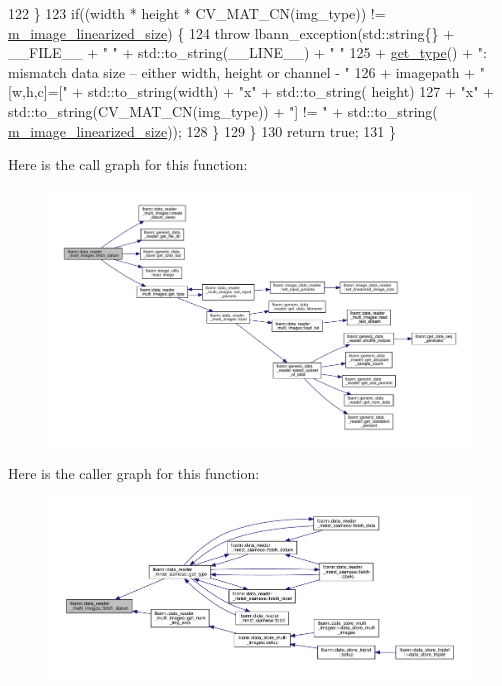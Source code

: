 \begin{DoxyCode}
122     \}
123     \textcolor{keywordflow}{if}((width * height * CV\_MAT\_CN(img\_type)) != \hyperlink{classlbann_1_1image__data__reader_af512f1f866c0f654309b7f28886dca9a}{m\_image\_linearized\_size}) \{
124       \textcolor{keywordflow}{throw} lbann\_exception(std::string\{\} + \_\_FILE\_\_ + \textcolor{stringliteral}{" "} + std::to\_string(\_\_LINE\_\_) + \textcolor{stringliteral}{" "}
125                             + \hyperlink{classlbann_1_1data__reader__multi__images_a9939a88a40caf7b2a27de08deca54ac1}{get\_type}() + \textcolor{stringliteral}{": mismatch data size -- either width, height or channel
       - "}
126                             + imagepath + \textcolor{stringliteral}{" [w,h,c]=["} + std::to\_string(width) + \textcolor{stringliteral}{"x"} + std::to\_string(
      height)
127                             + \textcolor{stringliteral}{"x"} + std::to\_string(CV\_MAT\_CN(img\_type)) + \textcolor{stringliteral}{"] != "} + std::to\_string(
      \hyperlink{classlbann_1_1image__data__reader_af512f1f866c0f654309b7f28886dca9a}{m\_image\_linearized\_size}));
128     \}
129   \}
130   \textcolor{keywordflow}{return} \textcolor{keyword}{true};
131 \}
\end{DoxyCode}
Here is the call graph for this function\+:\nopagebreak
\begin{figure}[H]
\begin{center}
\leavevmode
\includegraphics[width=350pt]{classlbann_1_1data__reader__multi__images_a37ef2f4e641c074d0f3bd51f11682fc7_cgraph}
\end{center}
\end{figure}
Here is the caller graph for this function\+:\nopagebreak
\begin{figure}[H]
\begin{center}
\leavevmode
\includegraphics[width=350pt]{classlbann_1_1data__reader__multi__images_a37ef2f4e641c074d0f3bd51f11682fc7_icgraph}
\end{center}
\end{figure}
